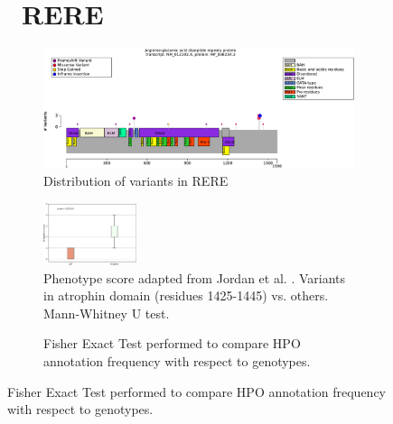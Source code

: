 \begin{figure}[htbp]
\section*{ RERE}
\centering
\begin{subfigure}[b]{0.95\textwidth}
\centering
\includegraphics[width=\textwidth]{ img/RERE_protein_diagram.pdf} 
\captionsetup{justification=raggedright,singlelinecheck=false}
\caption{Distribution of variants in RERE}
\end{subfigure}

\vspace{2em}

\begin{subfigure}[b]{0.95\textwidth}
\centering
\includegraphics[width=0.3\textwidth]{ img/RERE_stats.pdf} 
\captionsetup{justification=raggedright,singlelinecheck=false}
\caption{Phenotype score adapted from Jordan et al. \cite{PMID_29330883}. Variants in atrophin domain (residues 1425-1445) vs. others. Mann-Whitney U test.}
\end{subfigure}

\vspace{2em}

\begin{subfigure}[b]{0.95\textwidth}
\centering
{}
\captionsetup{justification=raggedright,singlelinecheck=false}
\caption{Fisher Exact Test performed to compare HPO annotation frequency with respect to genotypes.}
\end{subfigure}
\end{figure}

